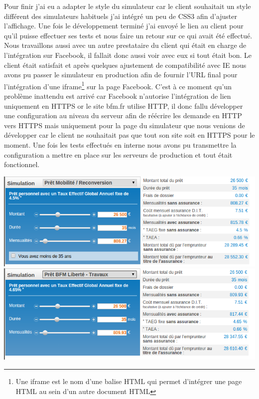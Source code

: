 \documentclass[a4paper,11pt,twoside]{report}
\begin{document}
      Pour finir j'ai eu a adapter le style du simulateur car le client souhaitait un style différent des simulateurs habituels j'ai intégré un peu de CSS3 afin d'ajuster l'affichage. Une fois le développement terminé j'ai envoyé le lien au client pour qu'il puisse effectuer ses tests et nous faire un retour sur ce qui avait été effectué. Nous travaillons aussi avec un autre prestataire du client qui était en charge de l'intégration sur Facebook, il fallait donc aussi voir avec eux si tout était bon. Le client était satisfait et après quelques ajustement de compatibilité avec IE nous avons pu passer le simulateur en production afin de fournir l'URL final pour l'intégration d'une iframe\footnote{Une iframe est le nom d'une balise HTML qui permet d'intégrer une page HTML au sein d'un autre document HTML} sur la page Facebook. C'est à ce moment qu'un problème inattendu est arrivé car Facebook n'autorise l'intégration de lien uniquement en HTTPS or le site bfm.fr utilise HTTP, il donc fallu développer une configuration au niveau du serveur afin de réécrire les demande en HTTP vers HTTPS mais uniquement pour la page du simulateur que nous venions de développer car le client ne souhaitait pas que tout son site soit en HTTPS pour le moment. Une fois les tests effectués en interne nous avons pu transmettre la configuration a mettre en place sur les serveurs de production et tout était fonctionnel.
      
      \begin{center}
	\includegraphics[width=\textwidth]{images/global_simulator1.png} 
	\includegraphics[width=\textwidth]{images/global_simulator2.png} 
	\label{global_simulator1}
      \end{center}
\end{document}
